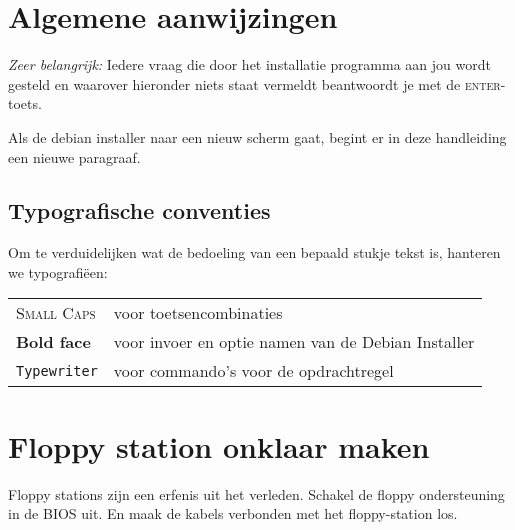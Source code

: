 \section{Algemene aanwijzingen}
\emph{Zeer belangrijk:} Iedere vraag die door het installatie programma aan jou wordt gesteld en waarover hieronder niets staat vermeldt beantwoordt je met de \textsc{enter}-toets.

Als de debian installer naar een nieuw scherm gaat, begint er in deze handleiding een nieuwe paragraaf.
\subsection{Typografische conventies}
Om te verduidelijken wat de bedoeling van een bepaald stukje tekst is, hanteren we typografi\"{e}en:
\begin{table}[H]
\begin{tabular}{l l}
	\textsc{Small Caps} & voor toetsencombinaties \\
	\textbf{Bold face} & voor invoer en optie namen van de Debian Installer\\
	\texttt{Typewriter} & voor commando's voor de opdrachtregel\\
\end{tabular}
\end{table}


\section{Floppy station onklaar maken}
Floppy stations zijn een erfenis uit het verleden. Schakel de floppy ondersteuning in de BIOS uit. En maak de kabels verbonden met het floppy-station los.


